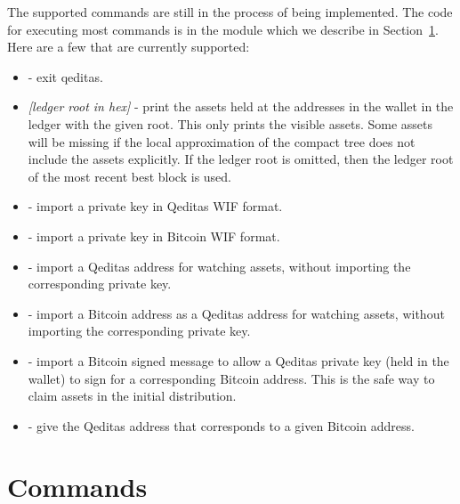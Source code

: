 {The supported commands are still in the process of being implemented.
The code for executing most commands is in the {} module
which we describe in Section~\ref{sec:commands}.
Here are a few that are currently supported:
\begin{itemize}
\item {} - exit qeditas.
\item {} {\it{[ledger root in hex]}} - print the assets held at the addresses in the wallet in the ledger with the given root. This only prints the visible assets. Some assets will be missing if the local approximation of the compact tree does not include the assets explicitly. If the ledger root is omitted, then the ledger root of the most recent best block is used.
\item {} - import a private key in Qeditas WIF format.
\item {} - import a private key in Bitcoin WIF format.
\item {} - import a Qeditas address for watching assets, without importing the corresponding private key.
\item {} - import a Bitcoin address as a Qeditas address for watching assets, without importing the corresponding private key.
\item {} - import a Bitcoin signed message to allow a Qeditas private key (held in the wallet) to sign for a corresponding Bitcoin address. This is the safe way to claim assets in the initial distribution.
\item {} - give the Qeditas address that corresponds to a given Bitcoin address.
\end{itemize}

\section{Commands}\label{sec:commands}

}
